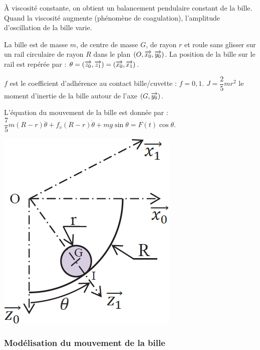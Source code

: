 \documentclass[10pt,fleqn]{article} %
\begin{document}
\begin{multicols}{2}
À viscosité constante, on obtient un balancement pendulaire constant de la bille. Quand
la viscosité augmente (phénomène de coagulation), l’amplitude d’oscillation de la bille varie.




La bille  est de masse $m$, de centre de masse $G$, de rayon $r$ et 
roule sans glisser sur un rail circulaire de rayon $R$ dans
le plan $\left( O, \overrightarrow{x_0}, \overrightarrow{y_0}\right)$. La position de la bille sur le rail est repérée par :
$\theta=\left(\overrightarrow{z_0},\overrightarrow{z_1}\right)=\left(\overrightarrow{x_0},\overrightarrow{x_1}\right)$.

$f$ est le coefficient d’adhérence au contact bille/cuvette : $f=0,1$. $J=\dfrac{2}{5}mr^2$ le moment d'inertie de la bille autour de l'axe $\left(G,\overrightarrow{{y_0}}\right)$.



L'équation du mouvement de la bille est donnée par :
 $\dfrac{7}{5} m\left(R-r \right)\ddot{\theta} + f_v \left(R-r \right)\dot{\theta} + mg \sin \theta = F(t) \cos \theta$.%



\begin{center}
\includegraphics[width=.6\linewidth]{images/ccp_05}
\end{center}



\subsubsection*{Modélisation du mouvement de la bille}


\end{multicols}
\end{document}
